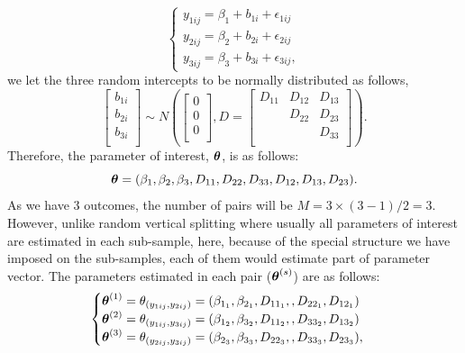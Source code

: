 \documentclass[11pt,a5paper,twoside]{book}
\newcommand{\bftheta}{\mbox{\boldmath $\theta$}}
\begin{document}
\begin{equation}
\label{eq_SV_models}
\begin{cases}
y_{1ij} = \beta_1 + b_{1i} + \epsilon_{1ij} \\
y_{2ij} = \beta_2 + b_{2i} + \epsilon_{2ij} \\
y_{3ij} = \beta_3 + b_{3i} + \epsilon_{3ij},
\end{cases}
\end{equation}
we let the three random intercepts to be normally distributed as follows,
\begin{equation}
\label{eq_SV_D}
\begin{bmatrix}
b_{1i} \\
b_{2i}\\
b_{3i}\\
\end{bmatrix} \sim N \left ( 
\begin{bmatrix}
0 \\
0\\
0\\
\end{bmatrix}, 
D=\begin{bmatrix}
D_{11} & D_{12} & D_{13}\\
 & D_{22} & D_{23}\\
&& D_{33}\\
\end{bmatrix}
\right).
\end{equation}
Therefore, the parameter of interest, $\bftheta$, is as follows:
\begin{equation}
\label{eq_SV_theta}
\bftheta= (\beta_1,\beta_2,\beta_3, D_{11},D_{22},D_{33},D_{12}, D_{13}, D_{23}).
\end{equation}
As we have $3$ outcomes, the number of pairs will be $M=3\times (3-1) /2 =3$. However, unlike random vertical splitting where usually all parameters of interest are estimated in each sub-sample, here, because of the special structure we have imposed on the sub-samples, each of them would estimate part of parameter vector. The parameters estimated in each pair ($\bftheta^{(s)}$) are as follows:
\begin{equation}
\label{eq_SV_pairs}
\begin{cases}
\bftheta^{(1)}=\theta_{(y_{1ij},y_{2ij})} = (\beta_{1_1},\beta_{2_1},D_{11_1},
,D_{22_1},D_{12_1}) \\
\bftheta^{(2)}=\theta_{(y_{1ij},y_{3ij})} = (\beta_{1_2},\beta_{3_2},D_{11_2},
,D_{33_2},D_{13_2}) \\
\bftheta^{(3)}=\theta_{(y_{2ij},y_{3ij})} = (\beta_{2_3},\beta_{3_3},D_{22_3},
,D_{33_3},D_{23_3}),
\end{cases}
\end{equation}
\end{document}
